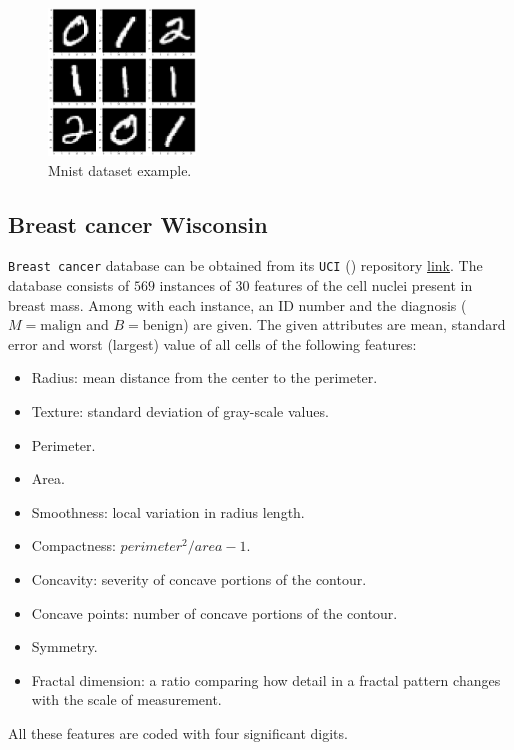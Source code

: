 \begin{figure}[h!]
    \centering
    \includegraphics[width=0.35\textwidth]{tex/images/mnist.png}
    \caption{Mnist dataset example.}\label{fig:mnist_example}
\end{figure}

\subsection{Breast cancer Wisconsin}

\texttt{Breast cancer} database can be obtained from its \texttt{UCI} (\cite{DUA:2019}) repository \href{https://archive.ics.uci.edu/ml/datasets/Breast+Cancer+Wisconsin+(Diagnostic)}{link}. The database consists of \(569\) instances of \(30\) features of the cell nuclei present in breast mass. Among with each instance, an ID number and the diagnosis (\( M = \text{malign}\) and \(B = \text{benign}\)) are given. The given attributes are mean, standard error and worst (largest) value of all cells of the following features:
\begin{itemize}
  \item Radius: mean distance from the center to the perimeter.
  \item Texture: standard deviation of gray-scale values.
  \item Perimeter.
  \item Area.
  \item Smoothness: local variation in radius length.
  \item Compactness: \(perimeter^{2} / area - 1\).
  \item Concavity: severity of concave portions of the contour.
  \item Concave points: number of concave portions of the contour.
  \item Symmetry.
  \item Fractal dimension: a ratio comparing how detail in a fractal pattern changes with the scale of measurement.
\end{itemize}
All these features are coded with four significant digits.
